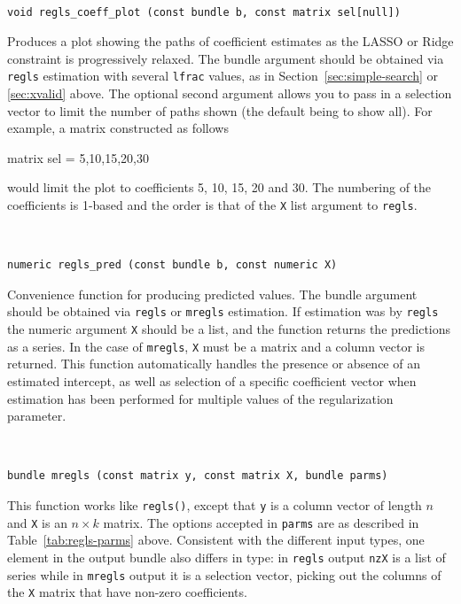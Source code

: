 \documentclass{article}
\newenvironment{funcdoc}
{\noindent\hrulefill\\[-12pt]}
{\medbreak}
\begin{document}
\begin{funcdoc}
\begin{verbatim}
void regls_coeff_plot (const bundle b, const matrix sel[null])
\end{verbatim}
  Produces a plot showing the paths of coefficient estimates as the
  LASSO or Ridge constraint is progressively relaxed. The bundle
  argument should be obtained via \texttt{regls} estimation with
  several \texttt{lfrac} values, as in Section~\ref{sec:simple-search}
  or \ref{sec:xvalid} above. The optional second argument allows you
  to pass in a selection vector to limit the number of paths shown
  (the default being to show all). For example, a matrix constructed
  as follows
\begin{code}
   matrix sel = {5,10,15,20,30}
\end{code}
  would limit the plot to coefficients 5, 10, 15, 20 and 30. The
  numbering of the coefficients is 1-based and the order is that of
  the \texttt{X} list argument to \texttt{regls}.
\end{funcdoc}

\begin{funcdoc}
\begin{verbatim}
numeric regls_pred (const bundle b, const numeric X)
\end{verbatim}
  Convenience function for producing predicted values.  The bundle
  argument should be obtained via \texttt{regls} or \texttt{mregls}
  estimation. If estimation was by \texttt{regls} the numeric argument
  \texttt{X} should be a list, and the function returns the
  predictions as a series. In the case of \texttt{mregls}, \texttt{X}
  must be a matrix and a column vector is returned.  This function
  automatically handles the presence or absence of an estimated
  intercept, as well as selection of a specific coefficient vector
  when estimation has been performed for multiple values of the
  regularization parameter.
\end{funcdoc}

\begin{funcdoc}
\begin{verbatim}
bundle mregls (const matrix y, const matrix X, bundle parms)
\end{verbatim}
  This function works like \texttt{regls()}, except that \texttt{y} is
  a column vector of length $n$ and \texttt{X} is an $n \times k$
  matrix. The options accepted in \texttt{parms} are as described in
  Table~\ref{tab:regls-parms} above. Consistent with the different
  input types, one element in the output bundle also differs in type:
  in \texttt{regls} output \texttt{nzX} is a list of series while in
  \texttt{mregls} output it is a selection vector, picking out the
  columns of the \texttt{X} matrix that have non-zero coefficients.
\end{funcdoc}
\end{document}
